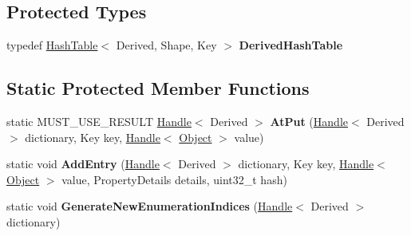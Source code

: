\subsection*{Protected Types}
\begin{DoxyCompactItemize}
\item 
\hypertarget{classv8_1_1internal_1_1_dictionary_a78e6772820ab06a86a4a940e6b1242ee}{}typedef \hyperlink{classv8_1_1internal_1_1_hash_table}{Hash\+Table}$<$ Derived, Shape, Key $>$ {\bfseries Derived\+Hash\+Table}\label{classv8_1_1internal_1_1_dictionary_a78e6772820ab06a86a4a940e6b1242ee}

\end{DoxyCompactItemize}
\subsection*{Static Protected Member Functions}
\begin{DoxyCompactItemize}
\item 
\hypertarget{classv8_1_1internal_1_1_dictionary_a600bf7c2263f46de39c7ffcf7b9f0446}{}static M\+U\+S\+T\+\_\+\+U\+S\+E\+\_\+\+R\+E\+S\+U\+L\+T \hyperlink{classv8_1_1internal_1_1_handle}{Handle}$<$ Derived $>$ {\bfseries At\+Put} (\hyperlink{classv8_1_1internal_1_1_handle}{Handle}$<$ Derived $>$ dictionary, Key key, \hyperlink{classv8_1_1internal_1_1_handle}{Handle}$<$ \hyperlink{classv8_1_1internal_1_1_object}{Object} $>$ value)\label{classv8_1_1internal_1_1_dictionary_a600bf7c2263f46de39c7ffcf7b9f0446}

\item 
\hypertarget{classv8_1_1internal_1_1_dictionary_ae20fc319658ca31c6c045487f8096f1b}{}static void {\bfseries Add\+Entry} (\hyperlink{classv8_1_1internal_1_1_handle}{Handle}$<$ Derived $>$ dictionary, Key key, \hyperlink{classv8_1_1internal_1_1_handle}{Handle}$<$ \hyperlink{classv8_1_1internal_1_1_object}{Object} $>$ value, Property\+Details details, uint32\+\_\+t hash)\label{classv8_1_1internal_1_1_dictionary_ae20fc319658ca31c6c045487f8096f1b}

\item 
\hypertarget{classv8_1_1internal_1_1_dictionary_a5f6ab26364c64ad9ffeac946a6b0253e}{}static void {\bfseries Generate\+New\+Enumeration\+Indices} (\hyperlink{classv8_1_1internal_1_1_handle}{Handle}$<$ Derived $>$ dictionary)\label{classv8_1_1internal_1_1_dictionary_a5f6ab26364c64ad9ffeac946a6b0253e}

\end{DoxyCompactItemize}
